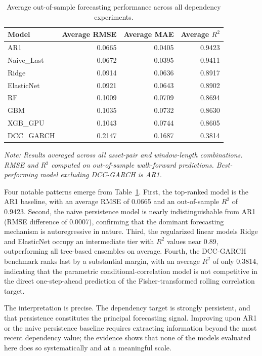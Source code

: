 \begin{table}[H]
    \centering
    \caption{Average out-of-sample forecasting performance across all dependency experiments.}
    \label{tab:model_ranking_summary}
    \begin{tabular}{lrrr}
        \toprule
        Model & Average RMSE & Average MAE & Average $R^2$ \\
        \midrule
        AR1 & 0.0665 & 0.0405 & 0.9423 \\
        Naive\_Last & 0.0672 & 0.0395 & 0.9411 \\
        Ridge & 0.0914 & 0.0636 & 0.8917 \\
        ElasticNet & 0.0921 & 0.0643 & 0.8902 \\
        RF & 0.1009 & 0.0709 & 0.8694 \\
        GBM & 0.1035 & 0.0732 & 0.8630 \\
        XGB\_GPU & 0.1043 & 0.0744 & 0.8605 \\
        DCC\_GARCH & 0.2147 & 0.1687 & 0.3814 \\
        \bottomrule
    \end{tabular}
    \par\smallskip\noindent\footnotesize{\textit{Note: Results averaged across all asset-pair and window-length combinations. RMSE and R$^2$ computed on out-of-sample walk-forward predictions. Best-performing model excluding DCC-GARCH is AR1.}}
\end{table}

Four notable patterns emerge from Table~\ref{tab:model_ranking_summary}. First, the top-ranked model is the AR1 baseline, with an average RMSE of 0.0665 and an out-of-sample $R^2$ of 0.9423. Second, the naive persistence model is nearly indistinguishable from AR1 (RMSE difference of 0.0007), confirming that the dominant forecasting mechanism is autoregressive in nature. Third, the regularized linear models Ridge and ElasticNet occupy an intermediate tier with $R^2$ values near 0.89, outperforming all tree-based ensembles on average. Fourth, the DCC-GARCH benchmark ranks last by a substantial margin, with an average $R^2$ of only 0.3814, indicating that the parametric conditional-correlation model is not competitive in the direct one-step-ahead prediction of the Fisher-transformed rolling correlation target.

The interpretation is precise. The dependency target is strongly persistent, and that persistence constitutes the principal forecasting signal. Improving upon AR1 or the naive persistence baseline requires extracting information beyond the most recent dependency value; the evidence shows that none of the models evaluated here does so systematically and at a meaningful scale.

